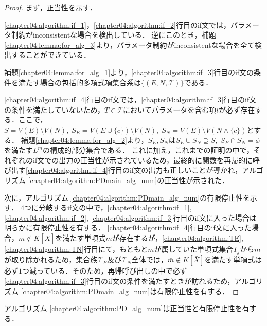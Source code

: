 \begin{proof}
	まず，正当性を示す．
	\par
	\ref{chapter04:algorithm:if_1}，\ref{chapter04:algorithm:if_2}行目のif文では，パラメータ制約がinconsistentな場合を検出している．
	逆にこのとき，補題\ref{chapter04:lemma:for_alg_3}より，パラメータ制約がinconsistentな場合を全て検出することができている．
	\par
	補題\ref{chapter04:lemma:for_alg_1}より，\ref{chapter04:algorithm:if_3}行目のif文の条件を満たす場合の包括的多項式項集合系は$\{(E, N, \mathscr{T})\}$である．
	\par
	\ref{chapter04:algorithm:if_4}行目のif文では，\ref{chapter04:algorithm:if_3}行目のif文の条件を満たしていないため，$T \in \mathscr{T}$においてパラメータを含む項$t$が必ず存在する．ここで，$S = V(E) \setminus V(N), \; S_E = V(E \cup \{ c \}) \setminus V(N), \; S_N = V(E) \setminus V(N \land \{ c \})$とする．
	補題\ref{chapter04:lemma:for_alg_2}より，$S_E, S_N$は$S_E \cup S_N \supseteq S,\; S_E \cap S_N = \phi$を満たす$L^m$の構成的部分集合である．
	これに加え，これまでの証明の中で，それぞれのif文での出力の正当性が示されているため，最終的に関数を再帰的に呼び出す\ref{chapter04:algorithm:if_4}行目のif文の出力も正しいことが導かれ，アルゴリズム \ref{chapter04:algorithm:PDmain_alg_num}の正当性が示された．
	\par
	次に，アルゴリズム \ref{chapter04:algorithm:PDmain_alg_num}の有限停止性を示す．
	$4$つに分岐するif文の中で，\ref{chapter04:algorithm:if_1}, \ref{chapter04:algorithm:if_2}, \ref{chapter04:algorithm:if_3}行目のif文に入った場合は明らかに有限停止性を有する．
	\ref{chapter04:algorithm:if_4}行目のif文に入った場合，$m \notin K[\bar{X}]$を満たす単項式$m$が存在するが，\ref{chapter04:algorithm:TE}, \ref{chapter04:algorithm:TN}行目にて，もともと$m$が属していた単項式集合$T_j$から$m$が取り除かれるため，集合族$\mathscr{T}_E$及び$\mathscr{T}_N$全体では，$\bar{m} \notin K[\bar{X}]$を満たす単項式は必ず$1$つ減っている．そのため，再帰呼び出しの中で必ず\ref{chapter04:algorithm:if_3}行目のif文の条件を満たすときが訪れるため，アルゴリズム \ref{chapter04:algorithm:PDmain_alg_num}は有限停止性を有する．
\end{proof}

\begin{corollary}
	アルゴリズム \ref{chapter04:algorithm:PD_alg_num}は正当性と有限停止性を有する．
\end{corollary}







